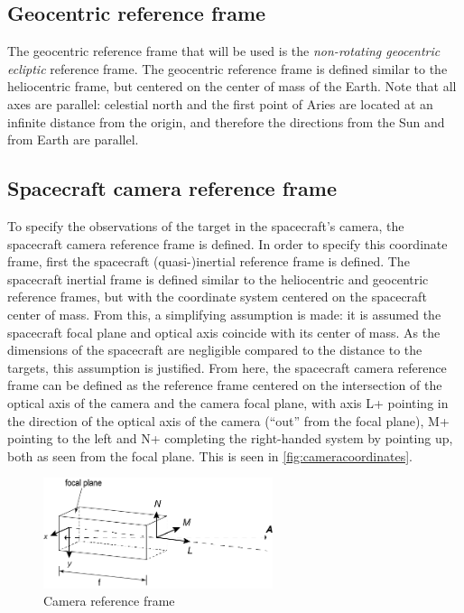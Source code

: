 \documentclass[a4paper,10pt]{article}
\begin{document}
\subsection{Geocentric reference frame}
The geocentric reference frame that will be used is the \textit{non-rotating geocentric ecliptic} reference frame. The geocentric reference frame is defined similar to the heliocentric frame, but centered on the center of mass of the Earth. Note that all axes are parallel: celestial north and the first point of Aries are located at an infinite distance from the origin, and therefore the directions from the Sun and from Earth are parallel.

\subsection{Spacecraft camera reference frame}
To specify the observations of the target in the spacecraft's camera, the spacecraft camera reference frame is defined. In order to specify this coordinate frame, first the spacecraft (quasi-)inertial reference frame is defined. The spacecraft inertial frame is defined similar to the heliocentric and geocentric reference frames, but with the coordinate system centered on the spacecraft center of mass. From this, a simplifying assumption is made: it is assumed the spacecraft focal plane and optical axis coincide with its center of mass. As the dimensions of the spacecraft are negligible compared to the distance to the targets, this assumption is justified. From here, the spacecraft camera reference frame can be defined as the reference frame centered on the intersection of the optical axis of the camera and the camera focal plane, with axis L+ pointing in the direction of the optical axis of the camera (``out'' from the focal plane), M+ pointing to the left and N+ completing the right-handed system by pointing up, both as seen from the focal plane. This is seen in \autoref{fig:cameracoordinates}.

\begin{figure}[htbp]
 \centering
 \includegraphics[width=0.6\textwidth]{cameracoordinates.png}
 \caption{Camera reference frame}
 \label{fig:cameracoordinates}
\end{figure}
\end{document}
